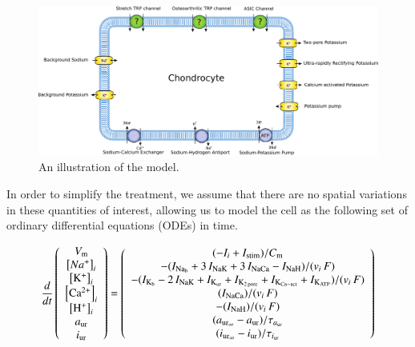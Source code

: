 \begin{figure}[ht]
  \centering
  \includegraphics[width=\textwidth]
  {../images/pdf/chondrocyte-model-cellml}
  \caption{An illustration of the model.}
  \label{fig:chondrocyte-model}
\end{figure}

In order to simplify the treatment, we assume that there are no
spatial variations in these quantities of interest, allowing us to
model the cell as the following set of ordinary differential equations
(ODEs) in time.

\begin{equation}
  \frac{d}{dt}
  \left(
    \begin{array}{c}
      V_{\rm m}\\
      \left[Na^{+}\right]_{i}\\
      \left[\rm K^{+}\right]_{i}\\
      \left[\rm Ca^{2+}\right]_{i}\\
      \left[\rm H^{+}\right]_{i}\\
      a_{\rm ur}\\
      i_{\rm ur}\\
    \end{array}
  \right)  = \left(
    \begin{array}{c}
        (-I_{i} + I_{\rm stim})/{C_{\rm m}}\\
      - (I_{\rm Na_{b}} + 3\, I_{\rm NaK} + 3\, I_{\rm NaCa} - I_{\rm
        NaH})/(v_{i}\, F)\\
      - (I_{\rm K_{b}} - 2\, I_{\rm NaK} + I_{\rm K_{ur}} + I_{\rm
        K_{2\, pore}} + I_{\rm K_{Ca-act}} + I_{\rm K_{ATP}})/(v_{i}\,
      F)\\
        (I_{\rm NaCa})/(v_{i}\, F)\\
      - (I_{\rm NaH})/(v_{i}\, F)\\
      (a_{{\rm ur}_{\infty}} - a_{\rm ur})/\tau_{a_{\rm ur}}\\
      (i_{{\rm ur}_{\infty}} - i_{\rm ur})/\tau_{i_{\rm ur}}\\
    \end{array}
  \right)
\end{equation}

